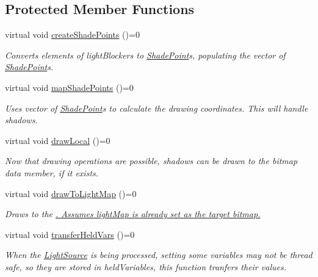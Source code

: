 \subsection*{Protected Member Functions}
\begin{DoxyCompactItemize}
\item 
virtual void \hyperlink{classlighting_1_1LightSource_a5bf73ee0586ba7620b917e57148d67be}{create\+Shade\+Points} ()=0
\begin{DoxyCompactList}\small\item\em Converts elements of light\+Blockers to \hyperlink{classlighting_1_1ShadePoint}{Shade\+Point}s, populating the vector of \hyperlink{classlighting_1_1ShadePoint}{Shade\+Point}s. \end{DoxyCompactList}\item 
virtual void \hyperlink{classlighting_1_1LightSource_a5bbde61a54af327d43dc4afee751412c}{map\+Shade\+Points} ()=0
\begin{DoxyCompactList}\small\item\em Uses vector of \hyperlink{classlighting_1_1ShadePoint}{Shade\+Point}s to calculate the drawing coordinates. This will handle shadows. \end{DoxyCompactList}\item 
virtual void \hyperlink{classlighting_1_1LightSource_ab15af06660d5cd4658d61ac2075aedea}{draw\+Local} ()=0
\begin{DoxyCompactList}\small\item\em Now that drawing operations are possible, shadows can be drawn to the bitmap data member, if it exists. \end{DoxyCompactList}\item 
virtual void \hyperlink{classlighting_1_1LightSource_a4e292cccdfb5784e97a1924ca00533b9}{draw\+To\+Light\+Map} ()=0
\begin{DoxyCompactList}\small\item\em Draws to the \hyperlink{}{. Assumes light\+Map is already set as the target bitmap. } \end{DoxyCompactList}\item 
virtual void \hyperlink{classlighting_1_1LightSource_ae4be8445f78d1314e112aed9c25933fc}{transfer\+Held\+Vars} ()=0
\begin{DoxyCompactList}\small\item\em When the \hyperlink{classlighting_1_1LightSource}{Light\+Source} is being processed, setting some variables may not be thread safe, so they are stored in held\+Variables, this function tranfers their values. \end{DoxyCompactList}\end{DoxyCompactItemize}
